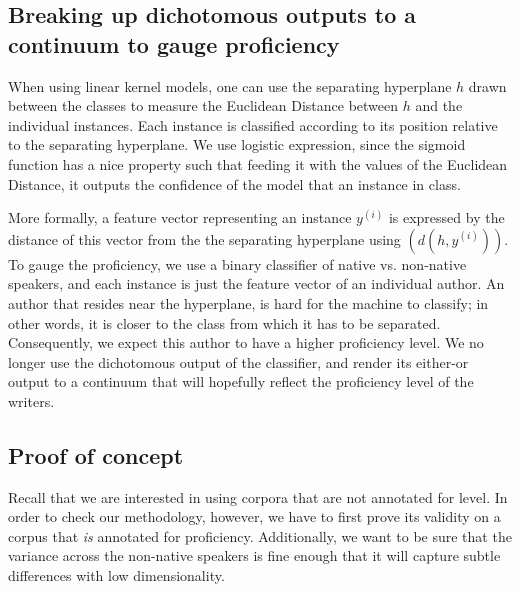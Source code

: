 \documentclass[11pt]{article}
\begin{document}
\subsection{Breaking up dichotomous outputs to a continuum to gauge proficiency}
When using linear kernel models, one can use the separating hyperplane $h$ drawn between the classes to measure the Euclidean Distance between $h$ and the individual instances. Each instance is classified according to its position relative to the separating hyperplane. We use logistic expression, since the sigmoid function has a nice property such that feeding it with the values of the Euclidean Distance, it outputs the confidence of the model that an instance in class.

More formally, a feature vector representing an instance  $y^{(i)}$ is expressed by the distance of this vector from the the separating hyperplane using $(d(h,y^{(i)}))$. To gauge the proficiency, we use a binary classifier of native vs. non-native speakers, and each instance is just the feature vector of an individual author. An author that resides near the hyperplane, is hard for the machine to classify; in other words, it is closer to the class from which it has to be separated. Consequently, we expect this author to have a higher proficiency level. We no longer use the dichotomous output of the classifier, and render its either-or output to a continuum that will hopefully reflect the proficiency level of the writers.  






\subsection{Proof of concept}
Recall that we are interested in using corpora that are not annotated for level. In order to check our methodology, however,  we have to first prove its validity on a corpus that \emph{is} annotated for proficiency. Additionally, we want to be sure that the variance across the non-native speakers is fine enough that it will capture subtle differences with low dimensionality.  
\end{document}
